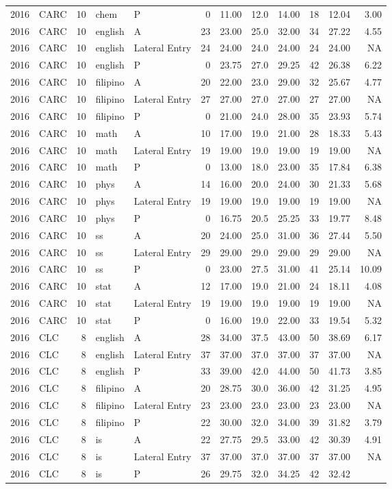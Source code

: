 \documentclass[]{article}
\begin{document}
\begin{longtable}[]{@{}rlrllrrrrrrr@{}}
2016 & CARC & 10 & chem & P & 0 & 11.00 & 12.0 & 14.00 & 18 & 12.04 &
3.00\tabularnewline
2016 & CARC & 10 & english & A & 23 & 23.00 & 25.0 & 32.00 & 34 & 27.22
& 4.55\tabularnewline
2016 & CARC & 10 & english & Lateral Entry & 24 & 24.00 & 24.0 & 24.00 &
24 & 24.00 & NA\tabularnewline
2016 & CARC & 10 & english & P & 0 & 23.75 & 27.0 & 29.25 & 42 & 26.38 &
6.22\tabularnewline
2016 & CARC & 10 & filipino & A & 20 & 22.00 & 23.0 & 29.00 & 32 & 25.67
& 4.77\tabularnewline
2016 & CARC & 10 & filipino & Lateral Entry & 27 & 27.00 & 27.0 & 27.00
& 27 & 27.00 & NA\tabularnewline
2016 & CARC & 10 & filipino & P & 0 & 21.00 & 24.0 & 28.00 & 35 & 23.93
& 5.74\tabularnewline
2016 & CARC & 10 & math & A & 10 & 17.00 & 19.0 & 21.00 & 28 & 18.33 &
5.43\tabularnewline
2016 & CARC & 10 & math & Lateral Entry & 19 & 19.00 & 19.0 & 19.00 & 19
& 19.00 & NA\tabularnewline
2016 & CARC & 10 & math & P & 0 & 13.00 & 18.0 & 23.00 & 35 & 17.84 &
6.38\tabularnewline
2016 & CARC & 10 & phys & A & 14 & 16.00 & 20.0 & 24.00 & 30 & 21.33 &
5.68\tabularnewline
2016 & CARC & 10 & phys & Lateral Entry & 19 & 19.00 & 19.0 & 19.00 & 19
& 19.00 & NA\tabularnewline
2016 & CARC & 10 & phys & P & 0 & 16.75 & 20.5 & 25.25 & 33 & 19.77 &
8.48\tabularnewline
2016 & CARC & 10 & ss & A & 20 & 24.00 & 25.0 & 31.00 & 36 & 27.44 &
5.50\tabularnewline
2016 & CARC & 10 & ss & Lateral Entry & 29 & 29.00 & 29.0 & 29.00 & 29 &
29.00 & NA\tabularnewline
2016 & CARC & 10 & ss & P & 0 & 23.00 & 27.5 & 31.00 & 41 & 25.14 &
10.09\tabularnewline
2016 & CARC & 10 & stat & A & 12 & 17.00 & 19.0 & 21.00 & 24 & 18.11 &
4.08\tabularnewline
2016 & CARC & 10 & stat & Lateral Entry & 19 & 19.00 & 19.0 & 19.00 & 19
& 19.00 & NA\tabularnewline
2016 & CARC & 10 & stat & P & 0 & 16.00 & 19.0 & 22.00 & 33 & 19.54 &
5.32\tabularnewline
2016 & CLC & 8 & english & A & 28 & 34.00 & 37.5 & 43.00 & 50 & 38.69 &
6.17\tabularnewline
2016 & CLC & 8 & english & Lateral Entry & 37 & 37.00 & 37.0 & 37.00 &
37 & 37.00 & NA\tabularnewline
2016 & CLC & 8 & english & P & 33 & 39.00 & 42.0 & 44.00 & 50 & 41.73 &
3.85\tabularnewline
2016 & CLC & 8 & filipino & A & 20 & 28.75 & 30.0 & 36.00 & 42 & 31.25 &
4.95\tabularnewline
2016 & CLC & 8 & filipino & Lateral Entry & 23 & 23.00 & 23.0 & 23.00 &
23 & 23.00 & NA\tabularnewline
2016 & CLC & 8 & filipino & P & 22 & 30.00 & 32.0 & 34.00 & 39 & 31.82 &
3.79\tabularnewline
2016 & CLC & 8 & is & A & 22 & 27.75 & 29.5 & 33.00 & 42 & 30.39 &
4.91\tabularnewline
2016 & CLC & 8 & is & Lateral Entry & 37 & 37.00 & 37.0 & 37.00 & 37 &
37.00 & NA\tabularnewline
2016 & CLC & 8 & is & P & 26 & 29.75 & 32.0 & 34.25 & 42 & 32.42 &

\end{longtable}
\end{document}
